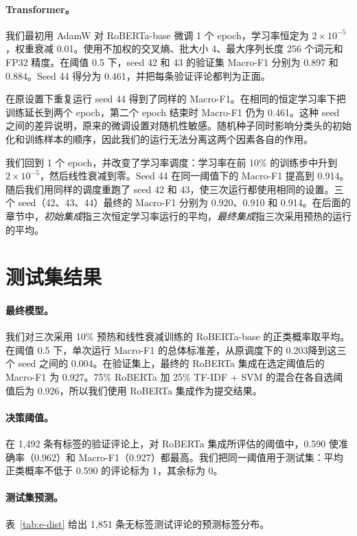 \documentclass[11pt,a4paper]{article}
\begin{document}
\paragraph{Transformer。}
我们最初用 AdamW 对 RoBERTa-base 微调 1 个 epoch，学习率恒定为 $2\times10^{-5}$，权重衰减 0.01。使用不加权的交叉熵、批大小 4、最大序列长度 256 个词元和 FP32 精度。在阈值 0.5 下，seed 42 和 43 的验证集 Macro-F1 分别为 0.897 和 0.884。Seed 44 得分为 0.461，并把每条验证评论都判为正面。

在原设置下重复运行 seed 44 得到了同样的 Macro-F1。在相同的恒定学习率下把训练延长到两个 epoch，第二个 epoch 结束时 Macro-F1 仍为 0.461。这种 seed 之间的差异说明，原来的微调设置对随机性敏感。随机种子同时影响分类头的初始化和训练样本的顺序，因此我们的运行无法分离这两个因素各自的作用。

我们回到 1 个 epoch，并改变了学习率调度：学习率在前 10\% 的训练步中升到 $2\times10^{-5}$，然后线性衰减到零。Seed 44 在同一阈值下的 Macro-F1 提高到 0.914。随后我们用同样的调度重跑了 seed 42 和 43，使三次运行都使用相同的设置。三个 seed（42、43、44）最终的 Macro-F1 分别为 0.920、0.910 和 0.914。在后面的章节中，\emph{初始集成}指三次恒定学习率运行的平均，\emph{最终集成}指三次采用预热的运行的平均。

\section{测试集结果}\label{sec:results}

\paragraph{最终模型。}
我们对三次采用 10\% 预热和线性衰减训练的 RoBERTa-base 的正类概率取平均。在阈值 0.5 下，单次运行 Macro-F1 的总体标准差，从原调度下的 0.203降到这三个 seed 之间的 0.004。在验证集上，最终的 RoBERTa 集成在选定阈值后的 Macro-F1 为 0.927。75\% RoBERTa 加 25\% TF-IDF + SVM 的混合在各自选阈值后为 0.926，所以我们使用 RoBERTa 集成作为提交结果。

\paragraph{决策阈值。}
在 1{,}492 条有标签的验证评论上，对 RoBERTa 集成所评估的阈值中，0.590 使准确率（0.962）和 Macro-F1（0.927）都最高。我们把同一阈值用于测试集：平均正类概率不低于 0.590 的评论标为 1，其余标为 0。

\paragraph{测试集预测。}
表~\ref{tab:e-dist} 给出 1{,}851 条无标签测试评论的预测标签分布。
\end{document}
